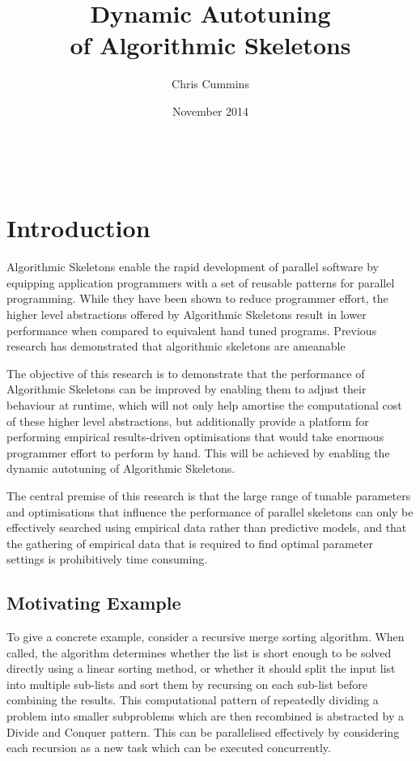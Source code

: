 \title{Dynamic Autotuning\\of Algorithmic Skeletons}
\author{Chris Cummins}
\date{November 2014}





\begin{center}
  \huge
  \textbf{\@title}
  \vspace{.5em}

  \normalsize
  \@author\\
  \@date
  \vspace{.5em}
\end{center}

\section*{Introduction}
Algorithmic Skeletons enable the rapid development of parallel
software by equipping application programmers with a set of reusable
patterns for parallel programming. While they have been shown to
reduce programmer effort, the higher level abstractions offered by
Algorithmic Skeletons result in lower performance when compared to
equivalent hand tuned programs. Previous research has demonstrated
that algorithmic skeletons are ameanable

The objective of this research is to demonstrate that the performance
of Algorithmic Skeletons can be improved by enabling them to adjust
their behaviour at runtime, which will not only help amortise the
computational cost of these higher level abstractions, but
additionally provide a platform for performing empirical
results-driven optimisations that would take enormous programmer
effort to perform by hand. This will be achieved by enabling the
dynamic autotuning of Algorithmic Skeletons.

The central premise of this research is that the large range of
tunable parameters and optimisations that influence the performance of
parallel skeletons can only be effectively searched using empirical
data rather than predictive models, and that the gathering of
empirical data that is required to find optimal parameter settings is
prohibitively time consuming.

\subsection{Motivating Example}

To give a concrete example, consider a recursive merge sorting
algorithm. When called, the algorithm determines whether the list is
short enough to be solved directly using a linear sorting method, or
whether it should split the input list into multiple sub-lists and
sort them by recursing on each sub-list before combining the
results. This computational pattern of repeatedly dividing a problem
into smaller subproblems which are then recombined is abstracted by a
Divide and Conquer pattern. This can be parallelised effectively by
considering each recursion as a new task which can be executed
concurrently.

